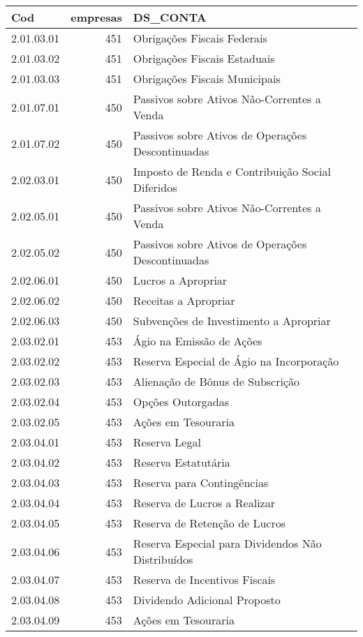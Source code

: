 \begin{table}[ht]
\centering
\begin{tabular}{lrl}
  \hline
Cod & empresas & DS\_CONTA \\ 
  \hline
2.01.03.01 & 451 & Obrigações Fiscais Federais \\ 
  2.01.03.02 & 451 & Obrigações Fiscais Estaduais \\ 
  2.01.03.03 & 451 & Obrigações Fiscais Municipais \\ 
  2.01.07.01 & 450 & Passivos sobre Ativos Não-Correntes a Venda \\ 
  2.01.07.02 & 450 & Passivos sobre Ativos de Operações Descontinuadas \\ 
  2.02.03.01 & 450 & Imposto de Renda e Contribuição Social Diferidos \\ 
  2.02.05.01 & 450 & Passivos sobre Ativos Não-Correntes a Venda \\ 
  2.02.05.02 & 450 & Passivos sobre Ativos de Operações Descontinuadas \\ 
  2.02.06.01 & 450 & Lucros a Apropriar \\ 
  2.02.06.02 & 450 & Receitas a Apropriar \\ 
  2.02.06.03 & 450 & Subvenções de Investimento a Apropriar \\ 
  2.03.02.01 & 453 & Ágio na Emissão de Ações \\ 
  2.03.02.02 & 453 & Reserva Especial de Ágio na Incorporação \\ 
  2.03.02.03 & 453 & Alienação de Bônus de Subscrição \\ 
  2.03.02.04 & 453 & Opções Outorgadas \\ 
  2.03.02.05 & 453 & Ações em Tesouraria \\ 
  2.03.04.01 & 453 & Reserva Legal \\ 
  2.03.04.02 & 453 & Reserva Estatutária \\ 
  2.03.04.03 & 453 & Reserva para Contingências \\ 
  2.03.04.04 & 453 & Reserva de Lucros a Realizar \\ 
  2.03.04.05 & 453 & Reserva de Retenção de Lucros \\ 
  2.03.04.06 & 453 & Reserva Especial para Dividendos Não Distribuídos \\ 
  2.03.04.07 & 453 & Reserva de Incentivos Fiscais \\ 
  2.03.04.08 & 453 & Dividendo Adicional Proposto \\ 
  2.03.04.09 & 453 & Ações em Tesouraria \\ 
   \hline
\end{tabular}
\end{table}
